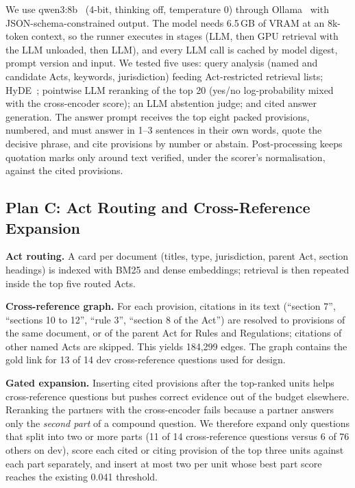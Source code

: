 \documentclass[conference]{IEEEtran}
\begin{document}
We use qwen3:8b~\cite{yang2025qwen3} (4-bit, thinking off, temperature 0) through Ollama~\cite{ollama} with
JSON-schema-constrained output. The model needs 6.5\,GB of VRAM at an 8k-token context, so the runner executes in
stages (LLM, then GPU retrieval with the LLM unloaded, then LLM), and every LLM call is cached by model digest,
prompt version and input. We tested five uses: query analysis (named and candidate Acts, keywords, jurisdiction)
feeding Act-restricted retrieval lists; HyDE~\cite{gao2023hyde}; pointwise LLM reranking of the top 20 (yes/no
log-probability mixed with the cross-encoder score); an LLM abstention judge; and cited answer generation. The
answer prompt receives the top eight packed provisions, numbered, and must answer in 1--3 sentences in their own
words, quote the decisive phrase, and cite provisions by number or abstain. Post-processing keeps quotation marks
only around text verified, under the scorer's normalisation, against the cited provisions.

\subsection{Plan C: Act Routing and Cross-Reference Expansion}

\textbf{Act routing.} A card per document (titles, type, jurisdiction, parent Act, section headings) is indexed with
BM25 and dense embeddings; retrieval is then repeated inside the top five routed Acts.

\textbf{Cross-reference graph.} For each provision, citations in its text (``section 7'', ``sections 10 to 12'',
``rule 3'', ``section 8 of the Act'') are resolved to provisions of the same document, or of the parent Act for
Rules and Regulations; citations of other named Acts are skipped. This yields 184,299 edges. The graph contains
the gold link for 13 of 14 dev cross-reference questions used for design.

\textbf{Gated expansion.} Inserting cited provisions after the top-ranked units helps cross-reference questions
but pushes correct evidence out of the budget elsewhere. Reranking the partners with the cross-encoder fails
because a partner answers only the \emph{second part} of a compound question. We therefore expand only questions
that split into two or more parts (11 of 14 cross-reference questions versus 6 of 76 others on dev), score each
cited or citing provision of the top three units against each part separately, and insert at most two per unit
whose best part score reaches the existing 0.041 threshold.
\end{document}
